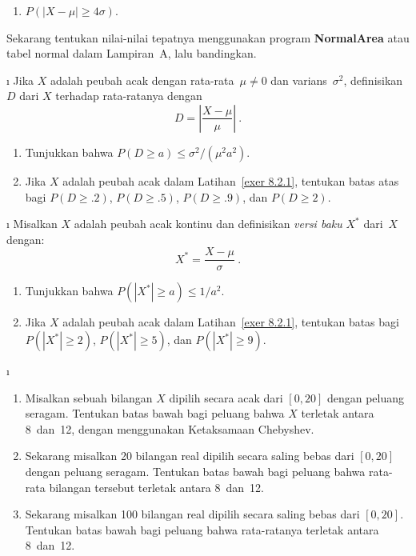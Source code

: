 {\begin{LJSItem}
\begin{enumerate}
\item $P(|X - \mu| \geq 4\sigma)$.
\end{enumerate}
\noindent Sekarang tentukan nilai-nilai tepatnya menggunakan program {\bf NormalArea}
atau tabel normal dalam Lampiran~A, lalu bandingkan.

\i\label{exer 8.2.103} Jika $X$ adalah peubah acak dengan rata-rata~$\mu \ne 0$ dan varians~$\sigma^2$,
definisikan  $D$ dari $X$ terhadap rata-ratanya dengan
$$
D = \left| \frac {X - \mu}\mu \right|\ .
$$
\begin{enumerate}
\item Tunjukkan bahwa $P(D \geq a) \leq \sigma^2/(\mu^2a^2)$.

\item Jika $X$ adalah peubah acak dalam Latihan~\ref{exer 8.2.1}, tentukan
batas atas bagi $P(D \geq .2)$, $P(D \geq .5)$, $P(D \geq .9)$, dan $P(D \geq
2)$.
\end{enumerate}

\i\label{exer 8.2.104} Misalkan $X$ adalah peubah acak kontinu dan definisikan {\em
versi baku} $X^*$ dari~$X$ dengan:
$$
X^* = \frac {X - \mu}\sigma\ .
$$
\begin{enumerate}
\item Tunjukkan bahwa $P(|X^*| \geq a) \leq 1/a^2$.

\item Jika $X$ adalah peubah acak dalam Latihan~\ref{exer 8.2.1}, tentukan
batas bagi $P(|X^*| \geq 2)$, $P(|X^*| \geq 5)$, dan $P(|X^*| \geq 9)$.
\end{enumerate}

\i\label{exer 8.2.105}
\begin{enumerate} 
\item Misalkan sebuah bilangan $X$ dipilih secara acak dari $[0,20]$ dengan
peluang seragam.  Tentukan batas bawah bagi peluang bahwa $X$ terletak antara
8~dan~12, dengan menggunakan Ketaksamaan Chebyshev.

\item Sekarang misalkan 20 bilangan real dipilih secara saling bebas dari $[0,20]$
dengan peluang seragam.  Tentukan batas bawah bagi peluang bahwa
rata-rata bilangan tersebut terletak antara 8~dan~12.

\item Sekarang misalkan 100 bilangan real dipilih secara saling bebas dari
$[0,20]$.  Tentukan batas bawah bagi peluang bahwa rata-ratanya terletak
antara 8~dan~12.
\end{enumerate}


\end{LJSItem}}
